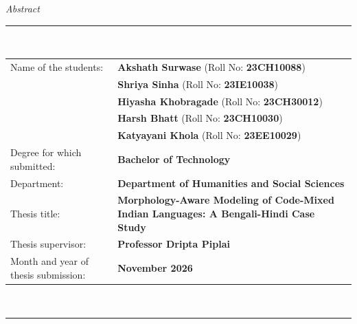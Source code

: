 \documentclass[11pt,a4paper]{report}
\newcommand{\TITLE}{Morphology-Aware Modeling of Code-Mixed Indian Languages: A Bengali-Hindi Case Study}
\begin{document}
\clearpage
{}
{}
\begin{center}{\Huge\itshape Abstract}\end{center}
\vspace{0.2in}
\singlespacing
\noindent\rule{\textwidth}{1.2pt}\\[6pt]
\begin{tabular}{@{}p{2.15in}p{3.65in}@{}}
Name of the students: & \textbf{Akshath Surwase} (Roll No: \textbf{23CH10088})\\
 & \textbf{Shriya Sinha} (Roll No: \textbf{23IE10038})\\
 & \textbf{Hiyasha Khobragade} (Roll No: \textbf{23CH30012})\\
 & \textbf{Harsh Bhatt} (Roll No: \textbf{23CH10030})\\
 & \textbf{Katyayani Khola} (Roll No: \textbf{23EE10029})\\[4pt]
Degree for which submitted: & \textbf{Bachelor of Technology}\\[4pt]
Department: & \textbf{Department of Humanities and Social Sciences}\\[4pt]
Thesis title: & \textbf{\TITLE}\\[4pt]
Thesis supervisor: & \textbf{Professor Dripta Piplai}\\[4pt]
Month and year of thesis submission: & \textbf{November 2026}\\
\end{tabular}\\[6pt]
\rule{\textwidth}{1.2pt}
\vspace{0.15in}
\end{document}
